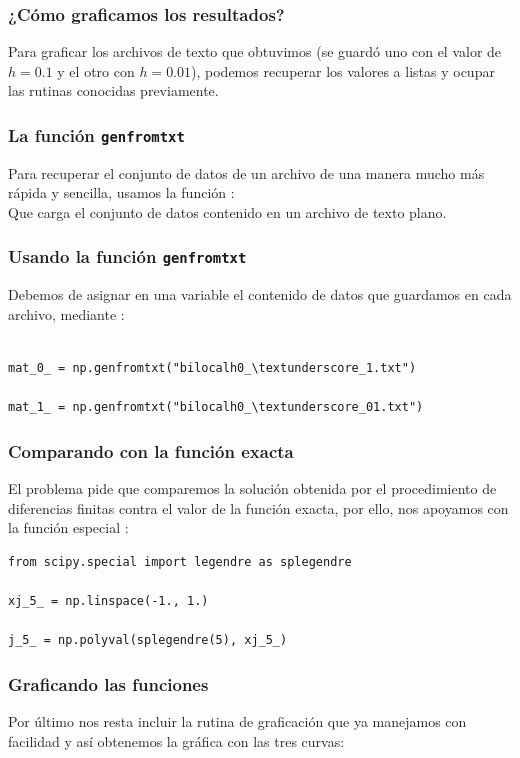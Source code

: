 \begin{frame}
\frametitle{¿Cómo graficamos los resultados?}
Para graficar los archivos de texto que obtuvimos (se guardó uno con el valor de $h=0.1$ y el otro con $h=0.01$), podemos recuperar los valores a listas y ocupar las rutinas conocidas previamente.
\end{frame}
\begin{frame}
\frametitle{La función \texttt{genfromtxt}}
Para recuperar el conjunto de datos de un archivo de una manera mucho más rápida y sencilla, usamos la función :
\\
\bigskip
Que carga el conjunto de datos contenido en un archivo de texto plano.
\end{frame}
\begin{frame}[fragile]
\frametitle{Usando la función \texttt{genfromtxt}}
Debemos de asignar en una variable el contenido de datos que guardamos en cada archivo, mediante :
\begin{lstlisting}[caption=Función \texttt{genfromtxt}, style=FormattedNumber, basicstyle=\linespread{1.1}\ttfamily=\small, columns=fullflexible]

mat_0_ = np.genfromtxt("bilocalh0_\textunderscore_1.txt")

mat_1_ = np.genfromtxt("bilocalh0_\textunderscore_01.txt")
\end{lstlisting}
\end{frame}
\begin{frame}[fragile]
\frametitle{Comparando con la función exacta}
El problema pide que comparemos la solución obtenida por el procedimiento de diferencias finitas contra el valor de la función exacta, por ello, nos apoyamos con la función especial :
\end{frame}
\begin{frame}[fragile]
\begin{lstlisting}[caption=Evaluando la función de Legendre, style=FormattedNumber, basicstyle=\linespread{1.1}\ttfamily=\small, columns=fullflexible]   
from scipy.special import legendre as splegendre

xj_5_ = np.linspace(-1., 1.)

j_5_ = np.polyval(splegendre(5), xj_5_)
\end{lstlisting}
\end{frame}
\begin{frame}[fragile]
\frametitle{Graficando las funciones}
Por último nos resta incluir la rutina de graficación que ya manejamos con facilidad y así obtenemos la gráfica con las tres curvas:
\end{frame}
